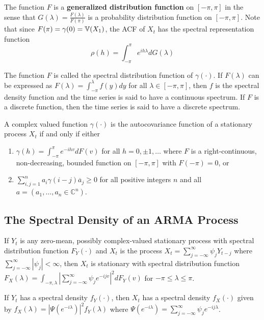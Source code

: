 \begin{remark}
  The function $F$ is a \textbf{generalized distribution function} on
  $[-\pi, \pi]$ in the sense that $G(\lambda) =
  \frac{F(\lambda)}{F(\pi)}$ is a probability distribution function on
  $[-\pi, \pi]$. Note that since $F(\pi) = \gamma(0) = \Var{X_{1}}$,
  the ACF of $X_{t}$ has the spectral representation function
  \begin{equation}
    \label{eq:73}
    \rho(h) = \int_{-\pi}^{\pi} e^{ih \lambda} dG(\lambda)
  \end{equation}

  The function $F$ is called the spectral distribution function of
  $\gamma(\cdot)$. If $F(\lambda)$ can be expressed as $F(\lambda) =
  \int_{-\pi}^{\lambda} f(y) dy$ for all $\lambda \in [-\pi, \pi]$,
  then $f$ is the spectral density function and the time series is
  said to have a continuous spectrum. If $F$ is a discrete function,
  then the time series is said to have a discrete spectrum.
\end{remark}

\begin{thm}
  \label{sec:spectral-analysis-1}
  A complex valued function $\gamma(\cdot)$ is the autocovariance
  function of a stationary process $X_{t}$ if and only if either
  \begin{enumerate}
  \item $\gamma(h) = \int_{-\pi}^{\pi} e^{-ihv} dF(v) $ for all $h =
    0, \pm 1, \dots$ where $F$ is a right-continuous, non-decreasing,
    bounded function on $[-\pi, \pi]$ with $F(-\pi) = 0$, or
  \item $\sum_{i, j =1}^{n} a_{i} \gamma(i - j) \overline a_{j} \geq
    0$ for all positive integers $n$ and all $a = (a_{1}, \dots, a_{n}
    \in \mathbb{C}^{n})$.
  \end{enumerate}
\end{thm}

\subsection{The Spectral Density of an ARMA Process}
\label{sec:spectral-density-an}

\begin{thm}
  \label{sec:spectral-density-an-1}
  If $Y_{t}$ is any zero-mean, possibly complex-valued stationary
  process with spectral distribution function $F_{Y}(\cdot)$ and
  $X_{t}$ is the process $X_{t} = \sum_{j = -\infty}^{\infty} \psi_{j}
  Y_{t-j}$ where $\sum_{j=-\infty}^{\infty} |\psi_{j}| < \infty$, then
  $X_{t}$ is stationary with spectral distribution function
  $F_{X}(\lambda) = \int_{-\pi, \lambda} | \sum_{j=-\infty}^{\infty}
  \psi_{j} e^{-ijv}|^{2} dF_{Y}(v)$ for $-\pi \leq \lambda \leq \pi$.

  If $Y_{t}$ has a spectral density $f_{Y}(\cdot)$, then $X_{t}$ has a
  spectral density $f_{X}(\cdot)$ given by $f_{X}(\lambda) =
  |\Psi(e^{-i\lambda})|^{2} f_{Y}(\lambda)$ where $\Psi(e^{-i\lambda})
  = \sum_{j=-\infty}^{\infty} \psi_{j} e^{-ij\lambda}$.
\end{thm}


